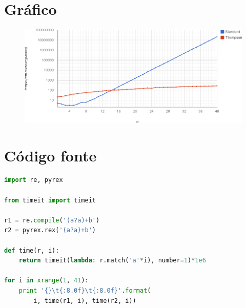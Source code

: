 \documentclass[a4paper,12pt,oneside,onecolumn]{uerj}
\begin{document}
\newpage
\section{Gráfico}

\begin{figure}[ht]
  \centering
  \includegraphics[scale=0.5]{figures/benchmark1.png}
\end{figure}

\section{Código fonte}

\begin{lstlisting}[language=python]
import re, pyrex

from timeit import timeit

r1 = re.compile('(a?a)+b')
r2 = pyrex.rex('(a?a)+b')

def time(r, i):
    return timeit(lambda: r.match('a'*i), number=1)*1e6

for i in xrange(1, 41):
    print '{}\t{:8.0f}\t{:8.0f}'.format(
        i, time(r1, i), time(r2, i))
\end{lstlisting}

     
   


\end{document}

